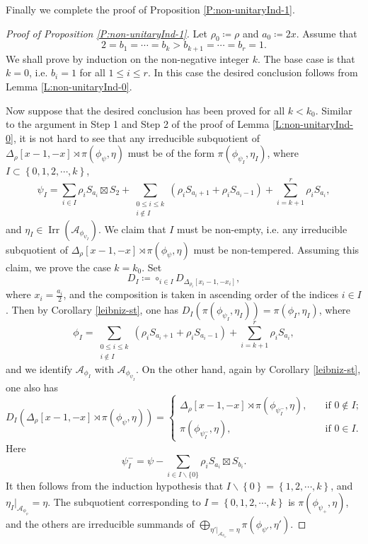 \documentclass[11pt,letterpaper]{amsart}
\theoremstyle{plain}
\numberwithin{theorem}{section}
\numberwithin{equation}{subsection}
\theoremstyle{remark}
\newcommand{\Irr}{\operatorname{Irr}}
\def\calA{\mathcal{A}}
\begin{document}
Finally we complete the proof of Proposition \ref{P:non-unitaryInd-1}.

\begin{proof}[Proof of Proposition \ref{P:non-unitaryInd-1}]
Let $\rho_0\coloneqq \rho$ and $a_0\coloneqq2x$. Assume that 
\[
    2= b_1=\cdots = b_k > b_{k+1} = \cdots =b_r=1.
\]
We shall prove by induction on the non-negative integer $k$. The base case is that $k=0$, i.e. $b_i=1$ for all $1\leq i\leq r$. In this case the desired conclusion follows from Lemma \ref{L:non-unitaryInd-0}. 

\vskip 5pt

Now suppose that the desired conclusion has been proved for all $k<k_0$. Similar to the argument in Step 1 and Step 2 of the proof of Lemma \ref{L:non-unitaryInd-0}, it is not hard to see that any irreducible subquotient of $\Delta_\rho\left[x-1,-x\right] \rtimes \pi\left(\phi_\psi,\eta\right)$ must be of the form $\pi\left(\phi_{\psi_I},\eta_I\right)$, where $I\subset\left\{0,1,2,\cdots,k\right\}$,
\[
    \psi_I = \sum_{i\in I} \rho_i S_{a_i}\boxtimes S_2 + \sum_{\substack{0\leq i \leq k \\ i\notin I}} \left(\rho_i S_{a_i+1} + \rho_i S_{a_i-1}\right) + \sum_{i=k+1}^r \rho_i S_{a_i},
 \]
and $\eta_I\in\Irr\left(\calA_{\phi_{\psi_I}}\right)$. We claim that $I$ must be non-empty, i.e. any irreducible subquotient of $\Delta_\rho\left[x-1,-x\right] \rtimes \pi\left(\phi_\psi,\eta\right)$ must be non-tempered. Assuming this claim, we prove the case $k=k_0$. Set
\[
    D_I \coloneqq \circ_{i\in I} D_{\Delta_{\rho_i}[x_i-1,-x_i]},
\]
where $x_i=\frac{a_i}{2}$, and the composition is taken in ascending order of the indices $i \in I$. Then by Corollary \ref{leibniz-st}, one has $D_I\left(\pi\left(\phi_{\psi_I},\eta_I\right)\right) = \pi\left(\phi_I, \eta_I\right)$, where
\[
    \phi_I = \sum_{\substack{0\leq i \leq k \\ i\notin I}} \left(\rho_i S_{a_i+1} + \rho_i S_{a_i-1}\right) + \sum_{i=k+1}^r \rho_i S_{a_i},
\]
and we identify $\calA_{\phi_I}$ with $\calA_{\phi_{\psi_I}}$. On the other hand, again by Corollary \ref{leibniz-st}, one also has 
\[
    D_I\left(\Delta_\rho\left[x-1,-x\right] \rtimes \pi\left(\phi_\psi,\eta\right)\right) = \begin{cases}
        \Delta_\rho\left[x-1,-x\right] \rtimes \pi\left(\phi_{\psi_I^-},\eta\right), \quad &\text{if }0\notin I;\\
        \pi\left(\phi_{\psi_I^-},\eta\right), \quad &\text{if }0\in I.
    \end{cases}
\]
Here
\[
    \psi_I^- = \psi - \sum_{i\in I\backslash\{0\}} \rho_i S_{a_i}\boxtimes S_{b_i}.
\]
It then follows from the induction hypothesis that $I\backslash\left\{0\right\} = \left\{1,2,\cdots,k\right\}$, and $\eta_I\big|_{\calA_{\phi_\psi}}=\eta$. The subquotient corresponding to $I=\left\{0,1,2,\cdots,k\right\}$ is $\pi\left(\phi_{\psi_+},\eta\right)$, and the others are irreducible summands of $\bigoplus_{\eta'|_{\calA_{\phi_{\psi}}}=\eta}\pi\left(\phi_{\psi'},\eta'\right)$. 


\end{proof}
\end{document}
